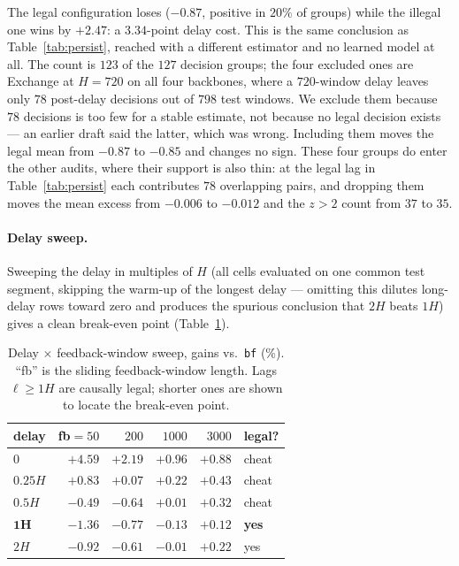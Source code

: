 \documentclass[a4paper,fleqn]{cas-sc}
\newcommand{\arm}[1]{\texttt{#1}}
\begin{document}
The legal configuration loses ($-0.87$, positive in $20\%$ of groups) while the
illegal one wins by $+2.47$: a $3.34$-point delay cost. This is the same
conclusion as Table~\ref{tab:persist}, reached with a different
estimator and no learned model at all. The count is $123$ of the $127$ decision
groups; the four excluded ones are Exchange at $H{=}720$ on all four backbones,
where a $720$-window delay leaves only $78$ post-delay decisions out of $798$ test
windows. We exclude them because $78$ decisions is too few for a stable estimate,
not because no legal decision exists --- an earlier draft said the latter, which
was wrong. Including them moves the legal mean from $-0.87$ to $-0.85$ and changes
no sign. These four groups do enter the other audits, where their support is also
thin: at the legal lag in Table~\ref{tab:persist} each contributes $78$
overlapping pairs, and dropping them moves the mean excess from $-0.006$ to
$-0.012$ and the $z>2$ count from $37$ to $35$.

\paragraph{Delay sweep.}
Sweeping the delay in multiples of $H$ (all cells evaluated on one common test
segment, skipping the warm-up of the longest delay --- omitting this dilutes
long-delay rows toward zero and produces the spurious conclusion that $2H$ beats
$1H$) gives a clean break-even point (Table~\ref{tab:delaysweep}).

\begin{table}[t]
\centering\small
\caption{Delay $\times$ feedback-window sweep, gains vs.\ \arm{bf} (\%). ``fb''
is the sliding feedback-window length. Lags $\ell\geq1H$ are causally legal;
shorter ones are shown to locate the break-even point.}
\label{tab:delaysweep}
\begin{tabular}{lrrrrl}
\toprule
delay & fb$=50$ & $200$ & $1000$ & $3000$ & legal? \\
\midrule
$0$      & $+4.59$ & $+2.19$ & $+0.96$ & $+0.88$ & cheat \\
$0.25H$  & $+0.83$ & $+0.07$ & $+0.22$ & $+0.43$ & cheat \\
$0.5H$   & $-0.49$ & $-0.64$ & $+0.01$ & $+0.32$ & cheat \\
$\mathbf{1H}$ & $-1.36$ & $-0.77$ & $-0.13$ & $+0.12$ & \textbf{yes} \\
$2H$     & $-0.92$ & $-0.61$ & $-0.01$ & $+0.22$ & yes \\
\bottomrule
\end{tabular}
\end{table}
\end{document}
